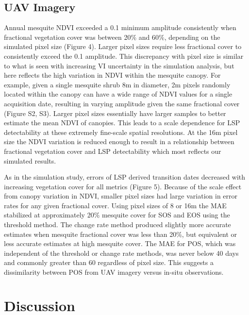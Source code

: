 \documentclass{article}
\begin{document}
\subsection{UAV Imagery}

Annual mesquite NDVI exceeded a 0.1 minimum amplitude consistently when fractional vegetation cover was between 20\% and 60\%, depending on the simulated pixel size (Figure 4). Larger pixel sizes require less fractional cover to consistently exceed the 0.1 amplitude. This discrepancy with pixel size is similar to what is seen with increasing VI uncertainty in the simulation analysis, but here reflects the high variation in NDVI within the mesquite canopy. For example, given a single mesquite shrub 8m in diameter, 2m pixels randomly located within the canopy can have a wide range of NDVI values for a single acquisition date, resulting in varying amplitude given the same fractional cover (Figure S2, S3). Larger pixel sizes essentially have larger samples to better estimate the mean NDVI of canopies. This leads to a scale dependence for LSP detectability at these extremely fine-scale spatial resolutions. At the 16m pixel size the NDVI variation is reduced enough to result in a relationship between fractional vegetation cover and LSP detectability which most reflects our simulated results.

As in the simulation study, errors of LSP derived transition dates decreased with increasing vegetation cover for all metrics (Figure 5). Because of the scale effect from canopy variation in NDVI, smaller pixel sizes had large variation in error rates for any given fractional cover. Using pixel sizes of 8 or 16m the MAE stabilized at approximately 20\% mesquite cover for SOS and EOS using the threshold method. The change rate method produced slightly more accurate estimates when mesquite fractional cover was less than 20\%, but equivalent or less accurate estimates at high mesquite cover. The MAE for POS, which was independent of the threshold or change rate methods, was never below 40 days and commonly greater than 60 regardless of pixel size. This suggests a dissimilarity between POS from UAV imagery versus in-situ observations.


\section{Discussion}
\end{document}
